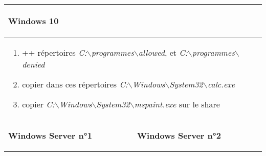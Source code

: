 \documentclass[a4paper]{article}
\begin{document}
\begin{center}
    \begin{tabular}{|p{7.5cm}|p{7.5cm}|} \hline
        \multicolumn{2}{|p{15cm}|}{ \begin{center} \textbf{Windows 10} \end{center} }

        \\ \hline

        \multicolumn{2}{|p{15cm}|}{
            \begin{enumerate}
                \item ++ répertoires \textit{C:$\backslash$programmes$\backslash$allowed}, et \textit{C:$\backslash$programmes$\backslash$denied}
                \item copier dans ces répertoires \textit{C:$\backslash$Windows$\backslash$System32$\backslash$calc.exe}
                \item copier \textit{C:$\backslash$Windows$\backslash$System32$\backslash$mspaint.exe} sur le share
            \end{enumerate}
        }

        \\ \hline

        \begin{center} \textbf{Windows Server n°1} \end{center} &
        \begin{center} \textbf{Windows Server n°2} \end{center} \\ \hline


\end{tabular}
\end{center}
\end{document}
